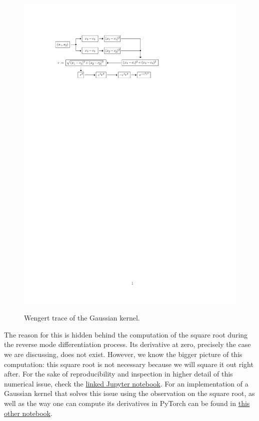 \documentclass[12pt]{report} %
\begin{document}
\begin{figure}[ht]
  {\includegraphics[width=.85\textwidth, trim={2cm 22cm 7cm 3cm}, clip=true]{imagenes/rbf_discussion/diagrama-gaussian-wengert.pdf}}
  \caption{Wengert trace of the Gaussian kernel.}
  \label{fig:wenger-trace-gaussian}
\end{figure}

The reason for this is hidden behind the computation of the square root during the reverse
mode differentiation process. Its derivative at zero, precisely the case we
are discussing, does not exist.
However, we know the bigger picture of this computation: this square root is not
necessary because we will square it out right after. For the sake of reproducibility 
and inspection in higher detail of this numerical issue, check the
\href{https://github.com/heqro/tfm-experiments/blob/main/introductory_notebooks/differentials_computation/differentials_rbf_NANs.ipynb}{linked
Jupyter notebook}. For an implementation of a Gaussian kernel that solves this issue
using the observation on the square root, as well 
as the way one can compute its derivatives in PyTorch can be found in
\href{https://github.com/heqro/tfm-experiments/blob/main/introductory_notebooks/differentials_computation/differentials_rbf_NANs_fixed.ipynb}
{this other notebook}.
\end{document}

